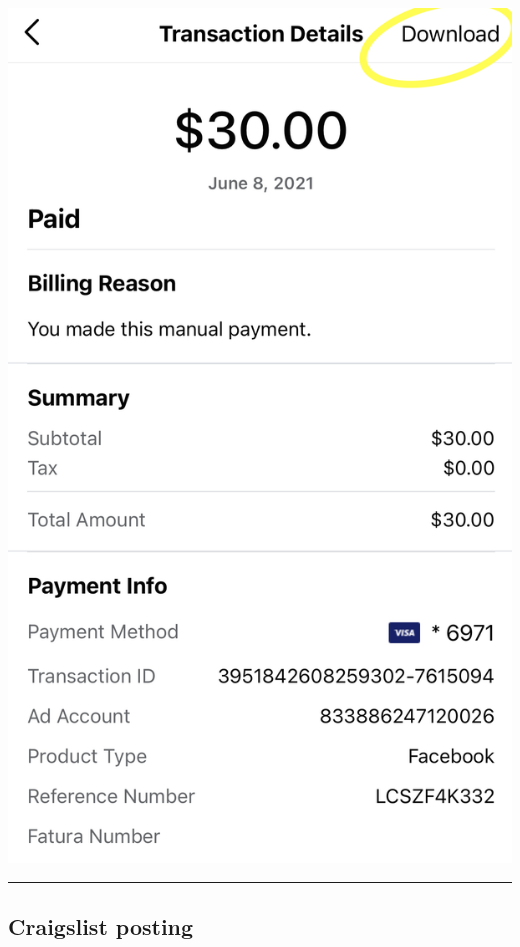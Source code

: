 \documentclass[]{book}
\begin{document}
\begin{enumerate}
  \includegraphics{images/lab_protocols/ig_pay/ig_6.png}
\end{enumerate}

\begin{center}\rule{0.5\linewidth}{0.5pt}\end{center}

\hypertarget{craigslist-posting}{%
\subsection{Craigslist posting}\label{craigslist-posting}}
\end{document}
